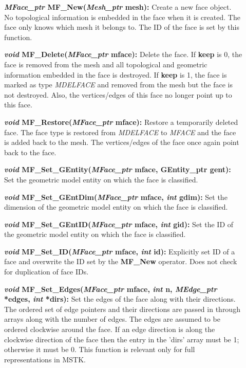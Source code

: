 \documentclass[12pt]{article}
\begin{document}
\begin{description}
\item[]\textbf{\textit{MFace\_ptr} MF\_New(\textit{Mesh\_ptr} mesh):} Create
a new face object. No topological information is embedded in the face
when it is created. The face only knows which mesh it belongs
to. The ID of the face is set by this function.

\item[]\textbf{\textit{void} MF\_Delete(\textit{MFace\_ptr} mface):}
  Delete the face. If \textbf{keep} is 0, the face is removed from the
  mesh and all topological and geometric information embedded in the
  face is destroyed. If \textbf{keep} is 1, the face is marked as type
  \textit{MDELFACE} and removed from the mesh but the face is not
  destroyed. Also, the vertices/edges of this face no longer point up
  to this face.
    
\item[]\textbf{\textit{void} MF\_Restore(\textit{MFace\_ptr}
    mface):} Restore a temporarily deleted face. The face type is
  restored from \textit{MDELFACE} to \textit{MFACE} and the face is
  added back to the mesh. The vertices/edges of the face once again point
  back to the face.

\item[]
  
\item[]\textbf{\textit{void} MF\_Set\_GEntity(\textit{MFace\_ptr} mface, GEntity\_ptr gent):} Set the geometric model entity on which the face is classified.

\item[]\textbf{\textit{void} MF\_Set\_GEntDim(\textit{MFace\_ptr} mface,
\textit{int} gdim):} Set the dimension of the geometric model entity on
which the face is classified.

\item[]\textbf{\textit{void} MF\_Set\_GEntID(\textit{MFace\_ptr} mface,
\textit{int} gid):} Set the ID of the geometric model entity on which
the face is classified.

\item[]\textbf{\textit{void} MF\_Set\_ID(\textit{MFace\_ptr} mface,
\textit{int} id):} Explicitly set ID of a face and overwrite the ID
set by the \textbf{MF\_New} operator. Does not check for duplication of face
IDs.

\item[]\textbf{\textit{void} MF\_Set\_Edges(\textit{MFace\_ptr} mface,
\textit{int} n, \textit{MEdge\_ptr} *edges, \textit{int} *dirs):} Set
the edges of the face along with their directions. The ordered set of
edge pointers and their directions are passed in through arrays along
with the number of edges. The edges are assumed to be ordered
clockwise around the face. If an edge direction is along the clockwise
direction of the face then the entry in the 'dirs' array must be 1;
otherwise it must be 0. This function is relevant only for full
representations in MSTK.


\end{description}
\end{document}

